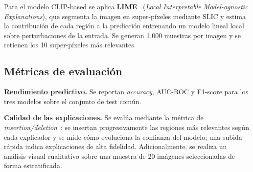 \documentclass[12pt,a4paper,twoside]{article}
\begin{document}
Para el modelo CLIP-based se aplica \textbf{LIME}~\cite{ribeiro2016lime}
(\textit{Local Interpretable Model-agnostic Explanations}), que segmenta la imagen
en super-píxeles mediante SLIC y estima la contribución de cada región a la
predicción entrenando un modelo lineal local sobre perturbaciones de la entrada. Se
generan 1.000 muestras por imagen y se retienen los 10 super-píxeles más relevantes.

\subsection{Métricas de evaluación}

\textbf{Rendimiento predictivo.} Se reportan \textit{accuracy}, AUC-ROC y F1-score
para los tres modelos sobre el conjunto de test común.

\textbf{Calidad de las explicaciones.} Se evalúa mediante la métrica de
\textit{insertion/deletion}~\cite{petsiuk2018rise}: se insertan progresivamente las
regiones más relevantes según cada explicador y se mide cómo evoluciona la confianza
del modelo; una subida rápida indica explicaciones de alta fidelidad. Adicionalmente,
se realiza un análisis visual cualitativo sobre una muestra de 20 imágenes
seleccionadas de forma estratificada.
\end{document}
